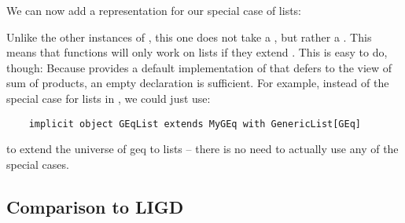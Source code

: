 We can now add a representation for our special case of lists:



Unlike the other instances of , this one does not take a ,
but rather a . This means that functions will only work on
lists if they extend . This is easy to do, though: Because
 provides a default implementation of  that defers to
the view of sum of products, an empty declaration is sufficient. For example,
instead of the special case for lists in , we could just use:
\begin{lstlisting}
    implicit object GEqList extends MyGEq with GenericList[GEq]
\end{lstlisting}
to extend the universe of geq to lists -- there is no need to actually use any
of the special cases.

\subsection{Comparison to LIGD}

